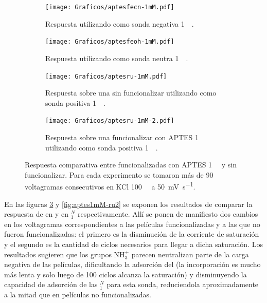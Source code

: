 				 \begin{figure}[ht!]	
					\begin{subfigure}[t]{0.495\textwidth}
			 	    \texttt{[image: Graficos/aptesfecn-1mM.pdf]}
			        \caption{Respuesta utilizando como sonda negativa \ferroferri\space \SI{1}{\milli\Molar}.}
			        \label{fig:aptes1mM-vc-fe}
			        \end{subfigure}
			        \begin{subfigure}[t]{0.495\textwidth}
			 	    \texttt{[image: Graficos/aptesfeoh-1mM.pdf]}
			        \caption{Respuesta utilizando como sonda neutra \fc\space \SI{1}{\milli\Molar}.}
			        \label{fig:aptes1mM-vc-fc}
			        \end{subfigure}
			         \begin{subfigure}[t]{0.495\textwidth}
			 	    \texttt{[image: Graficos/aptesru-1mM.pdf]}
			        \caption{Respuesta sobre una \pdmZ\space sin funcionalizar utilizando como sonda positiva \aminorutenio\space \SI{1}{\milli\Molar}.}
			        \label{fig:aptes1mM-vc-ru}
			        \end{subfigure}
			         \begin{subfigure}[t]{0.495\textwidth}
			 	    \texttt{[image: Graficos/aptesru-1mM-2.pdf]}
			        \caption{Respuesta sobre una \pdmZ\space funcionalizar con APTES \SI{1}{\milli\Molar} utilizando como sonda positiva \aminorutenio\space \SI{1}{\milli\Molar}.}
			        \label{fig:aptes1mM-vc-ru2}
			        \end{subfigure}
			        \caption[Voltagramas de \pdmZ$^P_3$ con \aminorutenio\space y \ferroferri]{Respuesta comparativa entre \pdmZ\space funcionalizadas con APTES \SI{1}{\milli\Molar} y sin funcionalizar. Para cada experimento se tomaron más de 90 voltagramas consecutivos en KCl \SI{100}{\milli\Molar} a \SI{50}{\milli\volt\per\second}.}
			        \label{fig:aptes1mM-vc}
			      	\end{figure}

		  
		  \vspace*{2mm} En las figuras \ref{fig:aptes1mM-vc-ru} y \ref{fig:aptes1mM-ru2} se exponen los resultados de comparar la respuesta de \ru\space en \pdmZ\space y en \pdmZ$^N_1$ respectivamente. Allí se ponen de manifiesto dos cambios en los voltagramas correspondientes a las películas funcionalizadas y a las que no fueron funcionalizadas: el primero es la disminución de la corriente de saturación y el segundo es la cantidad de ciclos necesarios para llegar a dicha saturación. Los resultados sugieren que los grupos NH$_3^+$ parecen neutralizan parte de la carga negativa de las películas\cite{calvo2009f}, dificultando la adsorción del \ru\space (la incorporación es mucho más lenta y solo luego de 100 ciclos alcanza la saturación) y disminuyendo la capacidad de adsorción de las \pdmZ$^N_{1}$ para esta sonda, reduciendola aproximadamente a la mitad que en películas no funcionalizadas.

